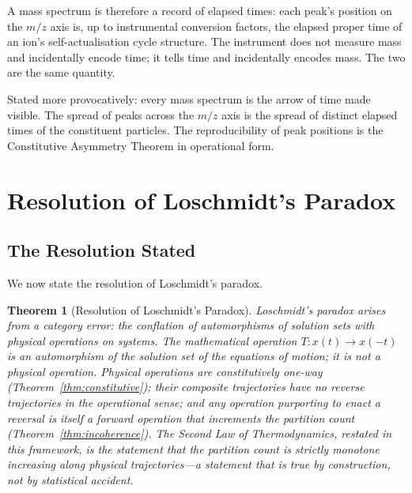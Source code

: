 \documentclass[twocolumn,10pt,a4paper]{article}
\newtheorem{theorem}{Theorem}[section]
\theoremstyle{definition}
\theoremstyle{remark}
\begin{document}
A mass spectrum is therefore a record of elapsed times: each peak's position on the $m/z$ axis is, up to instrumental conversion factors, the elapsed proper time of an ion's self-actualisation cycle structure. The instrument does not measure mass and incidentally encode time; it tells time and incidentally encodes mass. The two are the same quantity.

Stated more provocatively: every mass spectrum is the arrow of time made visible. The spread of peaks across the $m/z$ axis is the spread of distinct elapsed times of the constituent particles. The reproducibility of peak positions is the Constitutive Asymmetry Theorem in operational form.

\section{Resolution of Loschmidt's Paradox}
\label{sec:resolution}

\subsection{The Resolution Stated}

We now state the resolution of Loschmidt's paradox.

\begin{theorem}[Resolution of Loschmidt's Paradox]
\label{thm:resolution}
Loschmidt's paradox arises from a category error: the conflation of automorphisms of solution sets with physical operations on systems. The mathematical operation $T: x(t) \to x(-t)$ is an automorphism of the solution set of the equations of motion; it is not a physical operation. Physical operations are constitutively one-way (Theorem~\ref{thm:constitutive}); their composite trajectories have no reverse trajectories in the operational sense; and any operation purporting to enact a reversal is itself a forward operation that increments the partition count (Theorem~\ref{thm:incoherence}). The Second Law of Thermodynamics, restated in this framework, is the statement that the partition count is strictly monotone increasing along physical trajectories---a statement that is true by construction, not by statistical accident.
\end{theorem}
\end{document}
